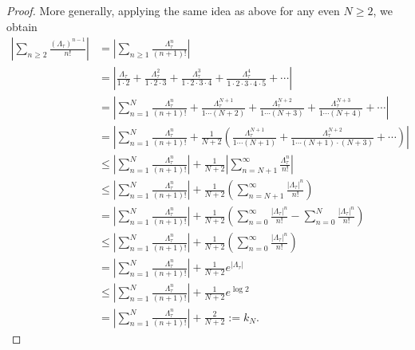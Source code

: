 \begin{proof}
More generally, applying the same idea as above for any even $N\geq 2$, we obtain 
\begin{align*}
\left| \sum_{n\geq 2} \frac{(\Lambda_\tau)^{n-1}}{n!}\right| 
	& =\left|\sum_{n\geq 1} \frac{\Lambda_\tau^{n}}{(n+1)!}\right|\\
	& = \left|\frac{\Lambda_\tau}{1\cdot 2}+ \frac{\Lambda_\tau^{2}}{1\cdot 2\cdot 3}+\frac{\Lambda_\tau^{3}}{1\cdot 2\cdot 3\cdot 4} + \frac{\Lambda_\tau^{4}}{1\cdot 2\cdot 3\cdot 4\cdot 5} + \cdots\right|\\
	& = \left|\sum_{n = 1}^N \frac{\Lambda_\tau^{n}}{(n+1)!} + \frac{\Lambda_\tau^{N+1}}{1\cdots (N+2)}+ \frac{\Lambda_\tau^{N+2}}{1\cdots (N+3)}+\frac{\Lambda_\tau^{N+3}}{1\cdots (N+4)} + \cdots\right|\\
	& = \left|\sum_{n = 1}^N \frac{\Lambda_\tau^{n}}{(n+1)!} + \frac{1}{N+2}\left(\frac{\Lambda_\tau^{N+1}}{1\cdots (N+1)}+ \frac{\Lambda_\tau^{N+2}}{1\cdots (N+1)\cdot(N+3)} + \cdots\right)\right|\\
	& \leq \left|\sum_{n = 1}^N \frac{\Lambda_\tau^{n}}{(n+1)!}\right| + \frac{1}{N+2}\left|\sum_{n = N+1}^{\infty} \frac{\Lambda_\tau^{n}}{n!}\right|\\
	& \leq \left|\sum_{n = 1}^N \frac{\Lambda_\tau^{n}}{(n+1)!}\right| + \frac{1}{N+2}\left(\sum_{n = N+1}^{\infty} \frac{|\Lambda_\tau|^{n}}{n!}\right)\\
	& = \left|\sum_{n = 1}^N \frac{\Lambda_\tau^{n}}{(n+1)!}\right| + \frac{1}{N+2}\left(\sum_{n =0}^{\infty} \frac{|\Lambda_\tau|^{n}}{n!} - \sum_{n =0}^{N} \frac{|\Lambda_\tau|^{n}}{n!}\right)\\
	& \leq \left|\sum_{n = 1}^N \frac{\Lambda_\tau^{n}}{(n+1)!}\right| + \frac{1}{N+2}\left(\sum_{n =0}^{\infty} \frac{|\Lambda_\tau|^{n}}{n!} \right)\\
	& = \left|\sum_{n = 1}^N \frac{\Lambda_\tau^{n}}{(n+1)!}\right| + \frac{1}{N+2}e^{|\Lambda_{\tau}|}\\
	& \leq \left|\sum_{n = 1}^N \frac{\Lambda_\tau^{n}}{(n+1)!}\right| + \frac{1}{N+2}e^{\log{2}}\\
	& = \left|\sum_{n = 1}^N \frac{\Lambda_\tau^{n}}{(n+1)!}\right| + \frac{2}{N+2}:= k_N.
\end{align*}


\end{proof}
